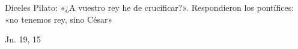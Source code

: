 \documentclass[../../rosario.tex]{subfiles}
\begin{document}
    Díceles Pilato: «¿A vuestro rey he de crucificar?». Respondieron los pontífices: «no tenemos rey, sino César»
    \begin{flushright}
    Jn. 19, 15
    \end{flushright}
\end{document}
